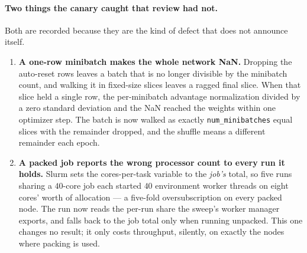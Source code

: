 \paragraph{Two things the canary caught that review had not.}
Both are recorded because they are the kind of defect that does not announce itself.

\begin{enumerate}[label=\arabic*.,leftmargin=*]
\item \textbf{A one-row minibatch makes the whole network NaN.} Dropping the auto-reset rows leaves a
  batch that is no longer divisible by the minibatch count, and walking it in fixed-size slices
  leaves a ragged final slice. When that slice held a single row, the per-minibatch advantage
  normalization divided by a zero standard deviation and the NaN reached the weights within one
  optimizer step. The batch is now walked as exactly \texttt{num\_\allowbreak minibatches} equal
  slices with the remainder dropped, and the shuffle means a different remainder each epoch.
\item \textbf{A packed job reports the wrong processor count to every run it holds.} Slurm sets the
  cores-per-task variable to the \emph{job's} total, so five runs sharing a $40$-core job each
  started $40$ environment worker threads on eight cores' worth of allocation --- a five-fold
  oversubscription on every packed node. The run now reads the per-run share the sweep's worker
  manager exports, and falls back to the job total only when running unpacked. This one changes no
  result; it only costs throughput, silently, on exactly the nodes where packing is used.
\end{enumerate}
